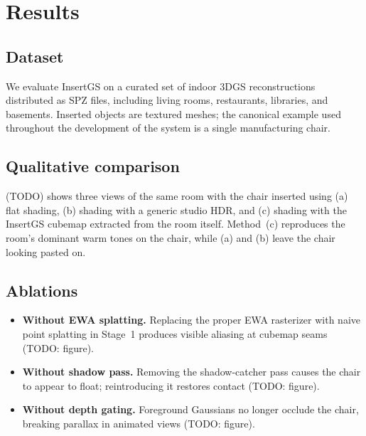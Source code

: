 
\chapter{Results}\label{chapter:results}

\section{Dataset}

We evaluate InsertGS on a curated set of indoor 3DGS reconstructions
distributed as \ac{SPZ} files, including living rooms, restaurants,
libraries, and basements. Inserted objects are textured meshes; the canonical
example used throughout the development of the system is a single
manufacturing chair.


\section{Qualitative comparison}

 (TODO) shows three views of the same room with the chair
inserted using (a) flat shading, (b) shading with a generic studio HDR, and
(c) shading with the InsertGS cubemap extracted from the room itself.
Method~(c) reproduces the room's dominant warm tones on the chair, while
(a) and (b) leave the chair looking pasted on.

\section{Ablations}

\begin{itemize}
  \item \textbf{Without EWA splatting.} Replacing the proper EWA rasterizer
        with naive point splatting in Stage~1 produces visible aliasing at
        cubemap seams (TODO: figure).
  \item \textbf{Without shadow pass.} Removing the shadow-catcher pass
        causes the chair to appear to float; reintroducing it restores
        contact (TODO: figure).
  \item \textbf{Without depth gating.} Foreground Gaussians no longer
        occlude the chair, breaking parallax in animated views (TODO:
        figure).
\end{itemize}

